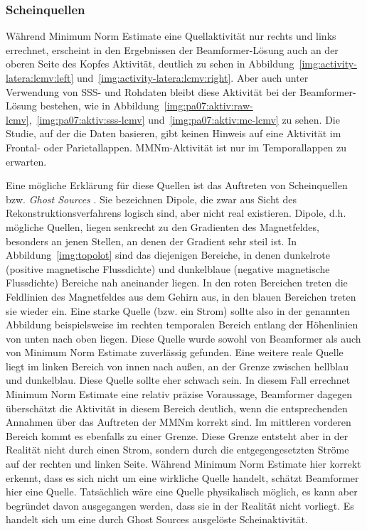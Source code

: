 \documentclass[doc,a4paper,12pt]{apa6}
\begin{document}
\subsubsection{Scheinquellen}

Während Minimum Norm Estimate eine Quellaktivität nur rechts und links errechnet, erscheint in den Ergebnissen der Beamformer-Lösung auch an der oberen Seite des Kopfes Aktivität, deutlich zu sehen in Abbildung~\ref{img:activity-latera:lcmv:left} und~\ref{img:activity-latera:lcmv:right}. Aber auch unter Verwendung von SSS- und Rohdaten bleibt diese Aktivität bei der Beamformer-Lösung bestehen, wie in Abbildung~\ref{img:pa07:aktiv:raw-lcmv},~\ref{img:pa07:aktiv:sss-lcmv} und~\ref{img:pa07:aktiv:mc-lcmv} zu sehen. Die Studie, auf der die Daten basieren, gibt keinen Hinweis auf eine Aktivität im Frontal- oder Parietallappen. MMNm-Aktivität ist nur im Temporallappen zu erwarten.

Eine mögliche Erklärung für diese Quellen ist das Auftreten von Scheinquellen bzw. \emph{Ghost Sources} \parencite{trujillo2004bayesian}. Sie bezeichnen Dipole, die zwar aus Sicht des Rekonstruktionsverfahrens logisch sind, aber nicht real existieren. Dipole, d.h. mögliche Quellen, liegen senkrecht zu den Gradienten des Magnetfeldes, besonders an jenen Stellen, an denen der Gradient sehr steil ist. In Abbildung~\ref{img:topolot} sind das diejenigen Bereiche, in denen dunkelrote (positive magnetische Flussdichte) und dunkelblaue (negative magnetische Flussdichte) Bereiche nah aneinander liegen. In den roten Bereichen treten die Feldlinien des Magnetfeldes aus dem Gehirn aus, in den blauen Bereichen treten sie wieder ein. Eine starke Quelle (bzw. ein Strom) sollte also in der genannten Abbildung beispielsweise im rechten temporalen Bereich entlang der Höhenlinien von unten nach oben liegen. Diese Quelle wurde sowohl von Beamformer als auch von Minimum Norm Estimate zuverlässig gefunden. Eine weitere reale Quelle liegt im linken Bereich von innen nach außen, an der Grenze zwischen hellblau und dunkelblau. Diese Quelle sollte eher schwach sein. In diesem Fall errechnet Minimum Norm Estimate eine relativ präzise Voraussage, Beamformer dagegen überschätzt die Aktivität in diesem Bereich deutlich, wenn die entsprechenden Annahmen über das Auftreten der MMNm korrekt sind. Im mittleren vorderen Bereich kommt es ebenfalls zu einer Grenze. Diese Grenze entsteht aber in der Realität nicht durch einen Strom, sondern durch die entgegengesetzten Ströme auf der rechten und linken Seite. Während Minimum Norm Estimate hier korrekt erkennt, dass es sich nicht um eine wirkliche Quelle handelt, schätzt Beamformer hier eine Quelle. Tatsächlich wäre eine Quelle physikalisch möglich, es kann aber begründet davon ausgegangen werden, dass sie in der Realität nicht vorliegt. Es handelt sich um eine durch Ghost Sources ausgelöste Scheinaktivität.
\end{document}
